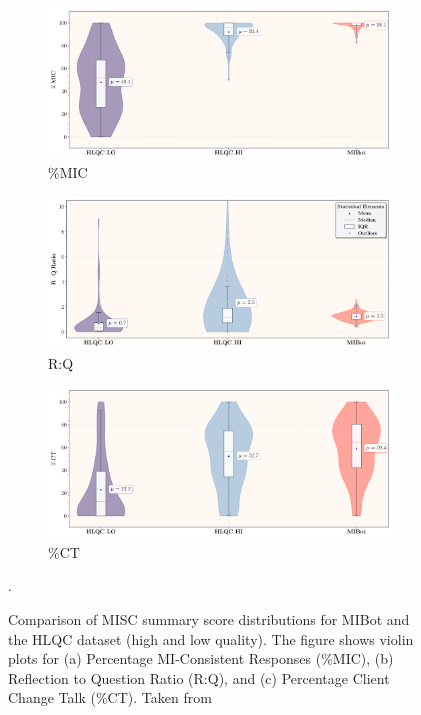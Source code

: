 \begin{figure}[htpb]
	\centering
	\begin{subfigure}[b]{0.9\textwidth}
		\centering
		\includegraphics[height=0.25\textheight, keepaspectratio]{fig/mic_enhanced.pdf}
		\caption{\%MIC}
	\end{subfigure}

	\begin{subfigure}[b]{0.9\textwidth}
		\centering
		\includegraphics[height=0.25\textheight, keepaspectratio]{fig/rq_enhanced.pdf}
		\caption{R:Q}
	\end{subfigure}

	\begin{subfigure}[b]{0.9\textwidth}
		\centering
		\includegraphics[height=0.25\textheight, keepaspectratio]{fig/cs_enhanced.pdf}
		\caption{\%CT}
	\end{subfigure}

	\caption[Comparison of MISC summary score distributions for MIBot and the HLQC dataset]{Comparison of MISC summary score distributions for MIBot and the HLQC dataset (high and low quality). The figure shows violin plots for (a) Percentage MI-Consistent Responses (\%MIC), (b) Reflection to Question Ratio (R:Q), and (c) Percentage Client Change Talk (\%CT). Taken from \citet{ali2025thesis}}.
	\label{fig:misc_distributions}
\end{figure}


